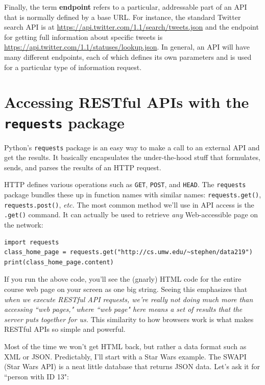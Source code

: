 \documentclass[12pt]{article}
\begin{document}
Finally, the term \textbf{endpoint} refers to a particular, addressable part
of an API that is normally defined by a base URL. For instance, the standard
Twitter search API is at \url{https://api.twitter.com/1.1/search/tweets.json}
and the endpoint for getting full information about specific tweets is \url{
https://api.twitter.com/1.1/statuses/lookup.json}. In general, an API will
have many different endpoints, each of which defines its own parameters and is
used for a particular type of information request.

\section{Accessing RESTful APIs with the \texttt{requests} package}

Python's \texttt{requests} package is an easy way to make a call to an
external API and get the results. It basically encapsulates the under-the-hood
stuff that formulates, sends, and parses the results of an HTTP request.

HTTP defines various operations such as \texttt{GET}, \texttt{POST}, and
\texttt{HEAD}. The \texttt{requests} package bundles these up in function
names with similar names: \texttt{requests.get()}, \texttt{requests.post()},
\textit{etc.} The most common method we'll use in API access is the
\texttt{.get()} command. It can actually be used to retrieve \textit{any}
Web-accessible page on the network:

\begin{Verbatim}[fontsize=\small,samepage=true,frame=none]
import requests
class_home_page = requests.get("http://cs.umw.edu/~stephen/data219")
print(class_home_page.content)
\end{Verbatim}

If you run the above code, you'll see the (gnarly) HTML code for the entire
course web page on your screen as one big string. Seeing this emphasizes that
\textit{when we execute RESTful API requests, we're really not doing much more
than accessing ``web pages," where ``web page" here means a set of results
that the server puts together for us.} This similarity to how browsers work is
what makes RESTful APIs so simple and powerful.

Most of the time we won't get HTML back, but rather a data format such as XML
or JSON. Predictably, I'll start with a Star Wars example. The SWAPI (Star
Wars API) is a neat little database that returns JSON data. Let's ask it for
``person with ID 13":
\end{document}
